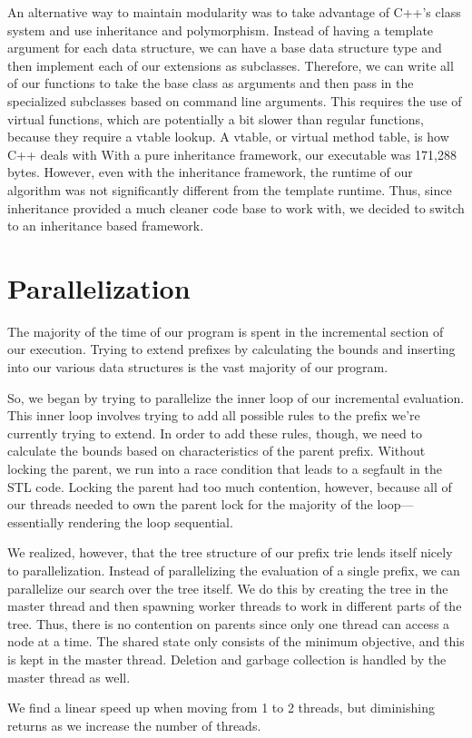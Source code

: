 An alternative way to maintain modularity was to take advantage of C++'s class system and use inheritance and polymorphism.
Instead of having a template argument for each data structure, we can have a base data structure type and then implement each of our extensions as subclasses.
Therefore, we can write all of our functions to take the base class as arguments and then pass in the specialized subclasses based on command line arguments.
This requires the use of virtual functions, which are potentially a bit slower than regular functions, because they require a vtable lookup.
A vtable, or virtual method table, is how C++ deals with 
With a pure inheritance framework, our executable was 171,288 bytes.
However, even with the inheritance framework, the runtime of our algorithm was not significantly different from the template runtime.
Thus, since inheritance provided a much cleaner code base to work with, we decided to switch to an inheritance based framework.

\section{Parallelization}

The majority of the time of our program is spent in the incremental section of our execution.
Trying to extend prefixes by calculating the bounds and inserting into our various data structures is the vast majority of our program.

So, we began by trying to parallelize the inner loop of our incremental evaluation.
This inner loop involves trying to add all possible rules to the prefix we're currently trying to extend.
In order to add these rules, though, we need to calculate the bounds based on characteristics of the parent prefix.
Without locking the parent, we run into a race condition that leads to a segfault in the STL code.
Locking the parent had too much contention, however, because all of our threads needed to own the parent lock for the majority of the loop---essentially rendering the loop sequential.

We realized, however, that the tree structure of our prefix trie lends itself nicely to parallelization.
Instead of parallelizing the evaluation of a single prefix, we can parallelize our search over the tree itself.
We do this by creating the tree in the master thread and then spawning worker threads to work in different parts of the tree.
Thus, there is no contention on parents since only one thread can access a node at a time.
The shared state only consists of the minimum objective, and this is kept in the master thread.
Deletion and garbage collection is handled by the master thread as well.

We find a linear speed up when moving from 1 to 2 threads, but diminishing returns as we increase the number of threads.